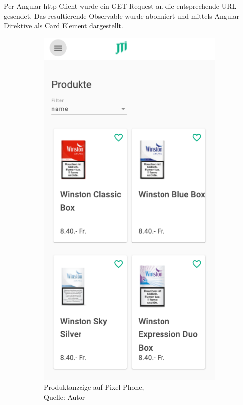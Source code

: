 Per Angular-http Client wurde ein GET-Request an die entsprechende URL gesendet. Das resultierende Observable wurde abonniert und mittels Angular Direktive als Card Element dargestellt. 

\begin{figure}[H]
	\begin{subfigure}[b]{0.45\textwidth}
		\includegraphics[scale=0.4]{images/productsPhone.PNG}
		\caption[Produktanzeige auf Pixel Phone]{Produktanzeige auf Pixel Phone, \\Quelle: Autor}
		\label{img: Prodcuts pixel}
	\end{subfigure}
	\hfill
	\begin{subfigure}[b]{0.45\textwidth}

\end{subfigure}
\end{figure}
